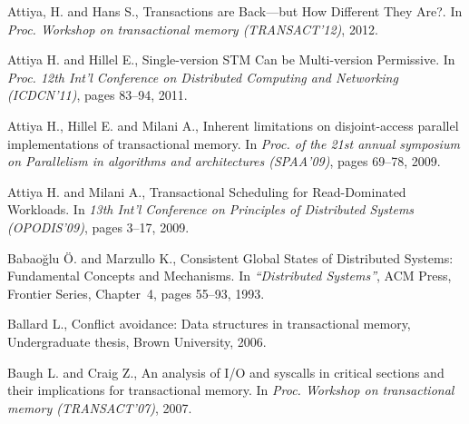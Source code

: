 \begin{thebibliography}{99}
{
Attiya, H. and Hans S.,
\newblock Transactions are Back---but How Different They Are?.
\newblock In {\em Proc. Workshop on transactional memory (TRANSACT'12)}, 2012.



Attiya  H. and Hillel E.,
Single-version STM Can be Multi-version Permissive. 
In {\it Proc. 12th Int'l Conference on Distributed Computing and Networking
(ICDCN'11)}, pages 83--94, 2011.


Attiya H., Hillel E. and Milani A.,
\newblock Inherent limitations on disjoint-access parallel implementations of
  transactional memory.
\newblock In {\em Proc. of the 21st annual symposium on
  Parallelism in algorithms and architectures (SPAA'09)}, pages 69--78, 2009.




Attiya H. and Milani A., 
Transactional Scheduling for Read-Dominated Workloads. 
In {\it 13th Int'l Conference on  Principles of Distributed Systems
(OPODIS'09)}, pages 3--17, 2009.









Babao\u{g}lu \"{O}. and Marzullo K., 
Consistent Global States of Distributed Systems: Fundamental
Concepts and Mechanisms.
In {\it ``Distributed Systems''},  
ACM Press, Frontier Series,  Chapter~4, pages 55--93, 1993.


Ballard L.,
\newblock Conflict avoidance: Data structures in transactional memory,
\newblock Undergraduate thesis, Brown University, 2006.



Baugh L. and Craig Z.,
An analysis of I/O and syscalls in critical sections and their implications for transactional memory.
\newblock In {\em Proc. Workshop on transactional memory (TRANSACT'07)}, 2007.


}
\end{thebibliography}
